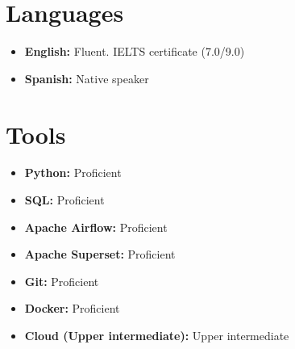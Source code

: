 \documentclass[11pt, letterpaper, sans]{moderncv}        %
\begin{document}
\section{Languages}
\vspace{3pt}

\begin{itemize}
	\item \textbf{English:} Fluent. IELTS certificate (7.0/9.0)
	\item \textbf{Spanish:} Native speaker
\end{itemize}

\section{Tools}
\vspace{3pt}

\begin{multicols}{2}
    \begin{itemize}
    	\item \textbf{Python:} Proficient
    	\item \textbf{SQL:} Proficient
    	\item \textbf{Apache Airflow:} Proficient
    	\item \textbf{Apache Superset:} Proficient
        \item \textbf{Git:} Proficient
        \item \textbf{Docker:} Proficient
        \item \textbf{Cloud (Upper intermediate):} Upper intermediate
    \end{itemize}
\end{multicols}

\end{document}
